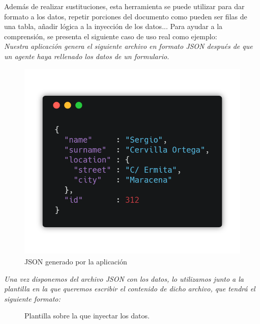 Además de realizar sustituciones, esta herramienta se puede utilizar para dar formato a los datos, repetir porciones del documento como pueden ser filas de una tabla, añadir lógica a la inyección de los datos... Para ayudar a la comprensión, se presenta el siguiente caso de uso real como ejemplo:\\

\textit{Nuestra aplicación genera el siguiente archivo en formato JSON después de que un agente haya rellenado los datos de un formulario.}

\begin{figure}[H]
	\centering
	\includegraphics[scale=0.4]{imagenes/json-carbone.png}
	\caption{JSON generado por la aplicación \label{fig:figura10}}
\end{figure}
\newpage

\textit{Una vez disponemos del archivo JSON con los datos, lo utilizamos junto a la plantilla en la que queremos escribir el contenido de dicho archivo, que tendrá el siguiente formato: }

\begin{figure}[H]
	\centering
	\caption{Plantilla sobre la que inyectar los datos. \label{fig:figura11}}
\end{figure}

